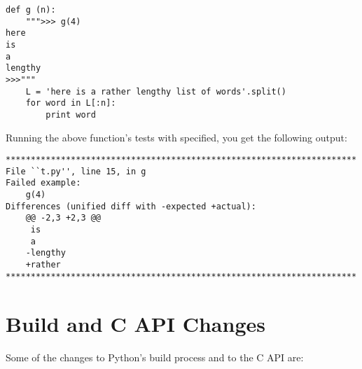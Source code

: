 \documentclass{howto}
\begin{document}
\begin{verbatim}
def g (n):
    """>>> g(4)
here
is
a
lengthy
>>>"""
    L = 'here is a rather lengthy list of words'.split()
    for word in L[:n]:
        print word
\end{verbatim}

Running the above function's tests with
 specified, you get the following output:

\begin{verbatim}
**********************************************************************
File ``t.py'', line 15, in g
Failed example:
    g(4)
Differences (unified diff with -expected +actual):
    @@ -2,3 +2,3 @@
     is
     a
    -lengthy
    +rather
**********************************************************************
\end{verbatim}


\section{Build and C API Changes}

Some of the changes to Python's build process and to the C API are:
\end{document}
